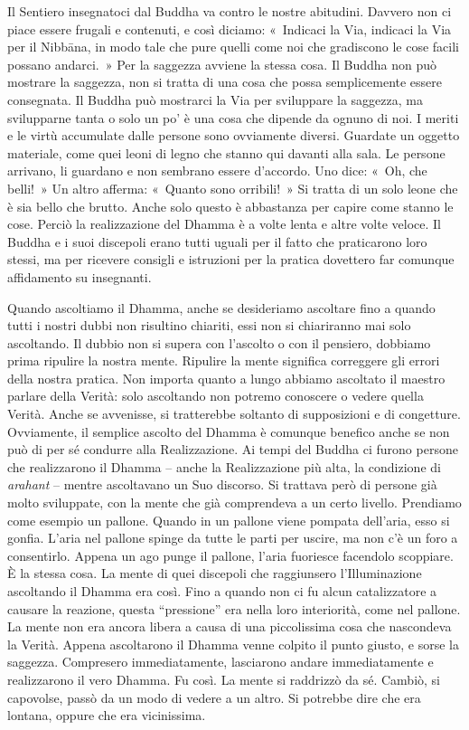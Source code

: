 Il Sentiero insegnatoci dal Buddha va contro le nostre abitudini.
Davvero non ci piace essere frugali e contenuti, e così diciamo:
«~Indicaci la Via, indicaci la Via per il Nibbāna, in modo tale
che pure quelli come noi che gradiscono le cose facili possano
andarci.~» Per la saggezza avviene la stessa cosa. Il Buddha non può
mostrare la saggezza, non si tratta di una cosa che possa semplicemente
essere consegnata. Il Buddha può mostrarci la Via per sviluppare la
saggezza, ma svilupparne tanta o solo un po' è una cosa che dipende da
ognuno di noi. I meriti e le virtù accumulate dalle persone sono
ovviamente diversi. Guardate un oggetto materiale, come quei leoni di
legno che stanno qui davanti alla sala. Le persone arrivano, li guardano
e non sembrano essere d'accordo. Uno dice: «~Oh, che belli!~» Un altro
afferma: «~Quanto sono orribili!~» Si tratta di un solo leone che è sia
bello che brutto. Anche solo questo è abbastanza per capire come stanno
le cose. Perciò la realizzazione del Dhamma è a volte lenta e altre
volte veloce. Il Buddha e i suoi discepoli erano tutti uguali per il
fatto che praticarono loro stessi, ma per ricevere consigli e istruzioni
per la pratica dovettero far comunque affidamento su insegnanti.

Quando ascoltiamo il Dhamma, anche se desideriamo ascoltare fino a
quando tutti i nostri dubbi non risultino chiariti, essi non si
chiariranno mai solo ascoltando. Il dubbio non si supera con l'ascolto o
con il pensiero, dobbiamo prima ripulire la nostra mente. Ripulire la
mente significa correggere gli errori della nostra pratica. Non importa
quanto a lungo abbiamo ascoltato il maestro parlare della Verità: solo
ascoltando non potremo conoscere o vedere quella Verità. Anche se
avvenisse, si tratterebbe soltanto di supposizioni e di congetture.
Ovviamente, il semplice ascolto del Dhamma è comunque benefico anche se
non può di per sé condurre alla Realizzazione. Ai tempi del Buddha ci
furono persone che realizzarono il Dhamma -- anche la Realizzazione più
alta, la condizione di \emph{arahant} -- mentre ascoltavano un Suo
discorso. Si trattava però di persone già molto sviluppate, con la mente
che già comprendeva a un certo livello. Prendiamo come esempio un
pallone. Quando in un pallone viene pompata dell'aria, esso si gonfia.
L'aria nel pallone spinge da tutte le parti per uscire, ma non c'è un
foro a consentirlo. Appena un ago punge il pallone, l'aria fuoriesce
facendolo scoppiare. È la stessa cosa. La mente di quei discepoli che
raggiunsero l'Illuminazione ascoltando il Dhamma era così. Fino a quando
non ci fu alcun catalizzatore a causare la reazione, questa
``pressione'' era nella loro interiorità, come nel pallone. La mente non
era ancora libera a causa di una piccolissima cosa che nascondeva la
Verità. Appena ascoltarono il Dhamma venne colpito il punto giusto, e
sorse la saggezza. Compresero immediatamente, lasciarono andare
immediatamente e realizzarono il vero Dhamma. Fu così. La mente si
raddrizzò da sé. Cambiò, si capovolse, passò da un modo di vedere a un
altro. Si potrebbe dire che era lontana, oppure che era vicinissima.

